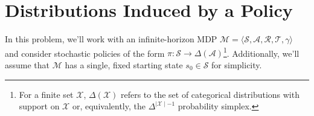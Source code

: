\section{Distributions Induced by a Policy}

In this problem, we'll work with an infinite-horizon MDP $\mathcal{M} = \langle \mathcal{S}, \mathcal{A}, \mathcal{R}, \mathcal{T}, \gamma \rangle$ and consider stochastic policies of the form $\pi: \mathcal{S} \rightarrow \Delta(\mathcal{A})$\footnote{For a finite set $\mathcal{X}$, $\Delta(\mathcal{X})$ refers to the set of categorical distributions with support on $\mathcal{X}$ or, equivalently, the $\Delta^{\mid \mathcal{X}\mid -1}$ probability simplex.}. Additionally, we'll assume that $\mathcal{M}$ has a single, fixed starting state $s_0 \in \mathcal{S}$ for simplicity.

\begin{enumerate}[(a)]

  

  

  

\end{enumerate}